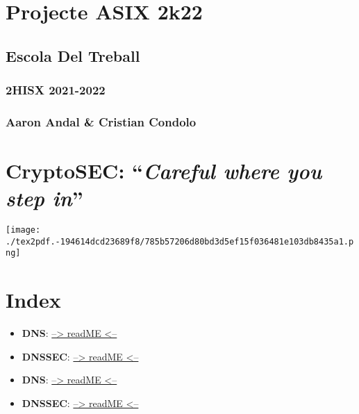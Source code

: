 \documentclass[]{article}
\date{}
\begin{document}
\hypertarget{projecte-asix-2k22}{%
\section{\texorpdfstring{\textbf{Projecte ASIX
2k22}}{Projecte ASIX 2k22}}\label{projecte-asix-2k22}}

\hypertarget{escola-del-treball}{%
\subsection{\texorpdfstring{\textbf{Escola Del
Treball}}{Escola Del Treball}}\label{escola-del-treball}}

\hypertarget{hisx-2021-2022}{%
\subsubsection{\texorpdfstring{\textbf{2HISX
2021-2022}}{2HISX 2021-2022}}\label{hisx-2021-2022}}

\hypertarget{aaron-andal-cristian-condolo}{%
\subsubsection{\texorpdfstring{\textbf{Aaron Andal \& Cristian
Condolo}}{Aaron Andal \& Cristian Condolo}}\label{aaron-andal-cristian-condolo}}

\hypertarget{cryptosec-careful-where-you-step-in}{%
\section{\texorpdfstring{\textbf{CryptoSEC}: ``\emph{Careful where you
step
in}''}{CryptoSEC: ``Careful where you step in''}}\label{cryptosec-careful-where-you-step-in}}

\texttt{[image: ./tex2pdf.-194614dcd23689f8/785b57206d80bd3d5ef15f036481e103db8435a1.png]}

\hypertarget{index}{%
\section{\texorpdfstring{\textbf{Index}}{Index}}\label{index}}

\begin{itemize}
\item
  \textbf{DNS}: \href{}{--\textgreater{} readME \textless{}--}
\item
  \textbf{DNSSEC}: \href{}{--\textgreater{} readME \textless{}--}
\item
  \textbf{DNS}: \href{}{--\textgreater{} readME \textless{}--}
\item
  \textbf{DNSSEC}: \href{}{--\textgreater{} readME \textless{}--}
\end{itemize}
\end{document}
